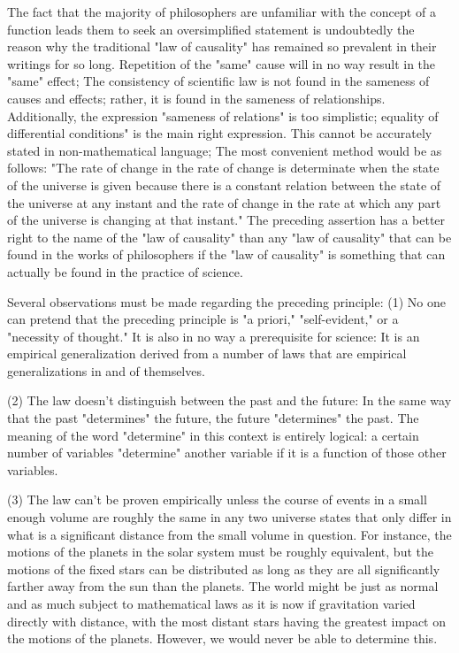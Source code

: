 \documentclass[a4paper,12pt]{book}[2004/02/16]
\theoremstyle{ilemma}
\theoremstyle{itheorem}
\theoremstyle{iother}
\theoremstyle{icorollary}
\theoremstyle{numcorollary}
\theoremstyle{idefinition}
\begin{document}
The fact that the majority of philosophers are unfamiliar with the concept of a function leads them to seek an oversimplified statement is undoubtedly the reason why the traditional "law of causality" has remained so prevalent in their writings for so long. Repetition of the "same" cause will in no way result in the "same" effect; The consistency of scientific law is not found in the sameness of causes and effects; rather, it is found in the sameness of relationships. Additionally, the expression "sameness of relations" is too simplistic; equality of differential
conditions" is the main right expression. This cannot be accurately stated in non-mathematical language; The most convenient method would be as follows: "The rate of change in the rate of change is determinate when the state of the universe is given because there is a constant relation between the state of the universe at any instant and the rate of change in the rate at which any part of the universe is changing at that instant." The preceding assertion has a better right to the name of the "law of causality" than any "law of causality" that can be found in the works of philosophers if the "law of causality" is something that can actually be found in the practice of science.

Several observations must be made regarding the preceding principle: (1) No one can pretend that the preceding principle is "a priori," "self-evident," or a "necessity of thought." It is also in no way a prerequisite for science: It is an empirical generalization derived from a number of laws that are empirical generalizations in and of themselves.

(2) The law doesn't distinguish between the past and the future: In the same way that the past "determines" the future, the future "determines" the past. The meaning of the word "determine" in this context is entirely logical: a certain number of variables "determine" another variable if it is a function of those other variables.

(3) The law can't be proven empirically unless the course of events in a small enough volume are roughly the same in any two universe states that only differ in what is a significant distance from the small volume in question. For instance, the motions of the planets in the solar system must be roughly equivalent, but the motions of the fixed stars can be distributed as long as they are all significantly farther away from the sun than the planets. The world might be just as normal and as much subject to mathematical laws as it is now if gravitation varied directly with distance, with the most distant stars having the greatest impact on the motions of the planets. However, we would never be able to determine this.
\end{document}

